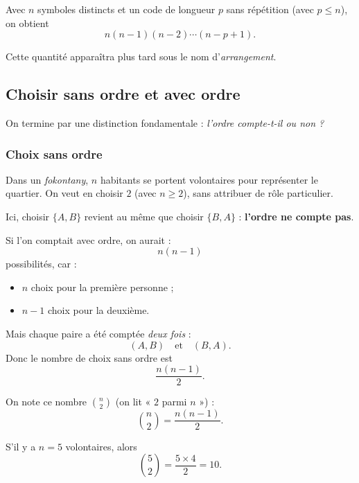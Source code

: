 \documentclass[11pt]{article}
\begin{document}
\begin{proposition}[Généralisation]\label{prop:codes-sans-repetition}
Avec \(n\) symboles distincts et un code de longueur \(p\) sans répétition (avec \(p\le n\)), on obtient
\[
\boxed{n(n-1)(n-2)\cdots(n-p+1)}.
\]
\end{proposition}

Cette quantité apparaîtra plus tard sous le nom d’\emph{arrangement}.

\subsection{Choisir sans ordre et avec ordre}\label{sec:sans-ordre-avec-ordre}

On termine par une distinction fondamentale :
\emph{l’ordre compte-t-il ou non ?}

\subsubsection*{Choix sans ordre}

\begin{exemple}
Dans un \emph{fokontany}, \(n\) habitants se portent volontaires pour représenter le quartier.
On veut en choisir \(2\) (avec \(n\ge 2\)), sans attribuer de rôle particulier.
\end{exemple}

\begin{solution}
Ici, choisir \(\{A,B\}\) revient au même que choisir \(\{B,A\}\) :
\textbf{l’ordre ne compte pas}.

Si l’on comptait avec ordre, on aurait :
\[
n(n-1)
\]
possibilités, car :
\begin{itemize}
    \item \(n\) choix pour la première personne ;
    \item \(n-1\) choix pour la deuxième.
\end{itemize}

Mais chaque paire a été comptée \emph{deux fois} :
\[
(A,B)\quad \text{et}\quad (B,A).
\]
Donc le nombre de choix sans ordre est
\[
\frac{n(n-1)}{2}.
\]
\end{solution}

\begin{definition}
On note ce nombre \(\binom{n}{2}\) (on lit « \(2\) parmi \(n\) ») :
\[
\binom{n}{2}=\frac{n(n-1)}{2}.
\]
\end{definition}

\begin{exemple}
S’il y a \(n=5\) volontaires, alors
\[
\binom{5}{2}=\frac{5\times 4}{2}=10.
\]
\end{exemple}
\end{document}
